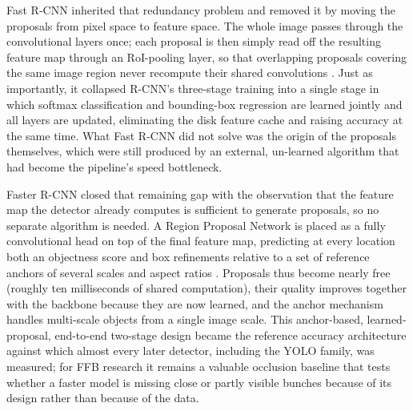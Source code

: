 Fast R-CNN inherited that redundancy problem and removed it by moving the proposals from pixel space to feature space. The whole image passes through the convolutional layers once; each proposal is then simply read off the resulting feature map through an RoI-pooling layer, so that overlapping proposals covering the same image region never recompute their shared convolutions \cite{girshick2015fastrcnn}. Just as importantly, it collapsed R-CNN's three-stage training into a single stage in which softmax classification and bounding-box regression are learned jointly and all layers are updated, eliminating the disk feature cache and raising accuracy at the same time. What Fast R-CNN did not solve was the origin of the proposals themselves, which were still produced by an external, un-learned algorithm that had become the pipeline's speed bottleneck.

Faster R-CNN closed that remaining gap with the observation that the feature map the detector already computes is sufficient to generate proposals, so no separate algorithm is needed. A Region Proposal Network is placed as a fully convolutional head on top of the final feature map, predicting at every location both an objectness score and box refinements relative to a set of reference anchors of several scales and aspect ratios \cite{ren2017fasterrcnn}. Proposals thus become nearly free (roughly ten milliseconds of shared computation), their quality improves together with the backbone because they are now learned, and the anchor mechanism handles multi-scale objects from a single image scale. This anchor-based, learned-proposal, end-to-end two-stage design became the reference accuracy architecture against which almost every later detector, including the YOLO family, was measured; for FFB research it remains a valuable occlusion baseline that tests whether a faster model is missing close or partly visible bunches because of its design rather than because of the data.

